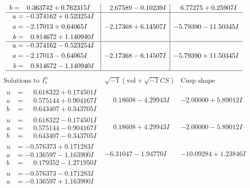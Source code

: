 \documentclass[1p]{elsarticle_modified}
\theoremstyle{definition}
\newcommand{\I}{\sqrt{-1}}
\begin{document}
$$\begin{array}{c|c|c}
\begin{aligned}
b &= \phantom{-}0.363742 + 0.762315 I\end{aligned}
 & \phantom{-}2.67589 - 0.10239 I & \phantom{-}6.77275 + 0.25907 I \\ \hline\begin{aligned}
u &= -0.374162 + 0.523254 I \\
a &= -2.17013 + 0.64065 I \\
b &= \phantom{-}0.814672 + 1.140940 I\end{aligned}
 & -2.17368 + 6.14507 I & -5.79390 - 11.50345 I \\ \hline\begin{aligned}
u &= -0.374162 - 0.523254 I \\
a &= -2.17013 - 0.64065 I \\
b &= \phantom{-}0.814672 - 1.140940 I\end{aligned}
 & -2.17368 - 6.14507 I & -5.79390 + 11.50345 I\\
 \hline 
 \end{array}$$\newpage$$\begin{array}{c|c|c}  
\text{Solutions to }I^u_{1}& \I (\text{vol} + \sqrt{-1}CS) & \text{Cusp shape}\\
 \hline 
\begin{aligned}
u &= \phantom{-}0.618322 + 0.174501 I \\
a &= \phantom{-}0.575144 + 0.904167 I \\
b &= \phantom{-}0.643407 + 0.343705 I\end{aligned}
 & \phantom{-}0.18608 - 4.29943 I & -2.00000 + 5.89012 I \\ \hline\begin{aligned}
u &= \phantom{-}0.618322 - 0.174501 I \\
a &= \phantom{-}0.575144 - 0.904167 I \\
b &= \phantom{-}0.643407 - 0.343705 I\end{aligned}
 & \phantom{-}0.18608 + 4.29943 I & -2.00000 - 5.89012 I \\ \hline\begin{aligned}
u &= -0.576373 + 0.171283 I \\
a &= -0.136597 - 1.163900 I \\
b &= \phantom{-}0.179352 - 1.271950 I\end{aligned}
 & -6.31047 - 1.94770 I & -10.09284 + 1.23846 I \\ \hline\begin{aligned}
u &= -0.576373 - 0.171283 I \\
a &= -0.136597 + 1.163900 I \\

\end{aligned}
\end{array}$$
\end{document}
